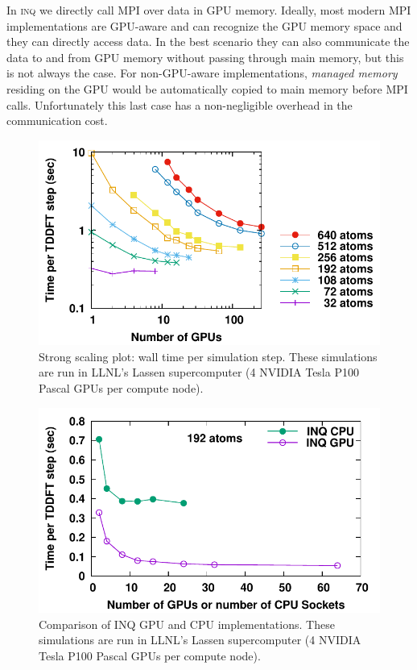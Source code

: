 In \textsc{inq} we directly call \textsc{MPI} over data in GPU memory.
Ideally, most modern \textsc{MPI} implementations are GPU-aware and can recognize the GPU memory space and they can directly access data.
In the best scenario they can also communicate the data to and from GPU memory without passing through main memory, but this is not always the case.
For non-GPU-aware implementations, \emph{managed memory} residing on the GPU would be automatically copied to main memory before \textsc{MPI} calls.
Unfortunately this last case has a non-negligible overhead in the communication cost.

\begin{figure}[h]
	\centering
	\includegraphics[width=1.0\linewidth]{figures/scaling/strong}
	\caption{
		Strong scaling plot: wall time per simulation step.
		These simulations are run in LLNL's Lassen supercomputer (4 NVIDIA Tesla P100 Pascal GPUs per compute node).
	}
	\label{fig:scaling_strong}
\end{figure}

\begin{figure}[h]
	\centering
	\includegraphics[width=1.0\linewidth]{figures/scaling/gpu_vs_cpu}
	\caption{
		Comparison of INQ GPU and CPU implementations.
		These simulations are run in LLNL's Lassen supercomputer (4 NVIDIA Tesla P100 Pascal GPUs per compute node).
	}
	\label{fig:scaling_gpu_vs_cpu}
\end{figure}

